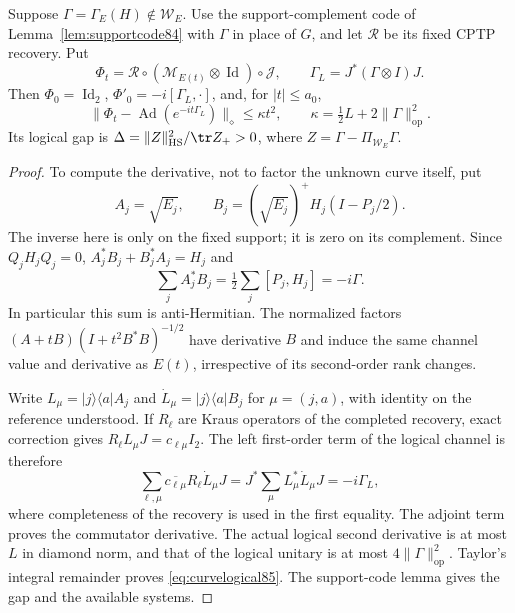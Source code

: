 \begin{lemma}
\label{lem:curvelogical85}
Suppose $\Gamma=\Gamma_E(H)\notin\mathcal W_E$.
Use the support-complement code of Lemma~\ref{lem:supportcode84}
with $\Gamma$ in place of $G$, and let $\mathcal R$ be its fixed
CPTP recovery.  Put
\[
 \Phi_t=\mathcal R\circ(\mathcal M_{E(t)}\otimes\operatorname{Id})
             \circ\mathcal J,\qquad
 \Gamma_L=J^*(\Gamma\otimes I)J.
\]
Then $\Phi_0=\operatorname{Id}_2$, $\Phi'_0=-i[\Gamma_L,\cdot]$,
and, for $|t|\le a_0$,
\begin{equation}\label{eq:curvelogical85}
 \|\Phi_t-\operatorname{Ad}(e^{-it\Gamma_L})\|_\diamond
 \le\kappa t^2,\qquad
 \kappa=\tfrac12L+2\|\Gamma\|_{\mathrm{op}}^2.
\end{equation}
Its logical gap is
$\Delta=\|Z\|_{\mathrm{HS}}^2/\tr Z_+>0$,
where $Z=\Gamma-\Pi_{\mathcal W_E}\Gamma$.
\end{lemma}
\begin{proof}
To compute the derivative, not to factor the unknown curve itself,
put
\[
 A_j=\sqrt{E_j},\qquad
 B_j=(\sqrt{E_j})^+H_j(I-P_j/2).
\]
The inverse here is only on the fixed support; it is zero on its
complement.  Since $Q_jH_jQ_j=0$,
$A_j^*B_j+B_j^*A_j=H_j$ and
\[
 \sum_j A_j^*B_j=\tfrac12\sum_j[P_j,H_j]=-i\Gamma.
\]
In particular this sum is anti-Hermitian.  The normalized factors
$(A+tB)(I+t^2B^*B)^{-1/2}$ have derivative $B$ and induce the
same channel value and derivative as $E(t)$, irrespective of its
second-order rank changes.

Write $L_\mu=|j\rangle\langle a|A_j$ and
$\dot L_\mu=|j\rangle\langle a|B_j$ for $\mu=(j,a)$,
with identity on the reference understood.  If $R_\ell$ are Kraus
operators of the completed recovery, exact correction gives
$R_\ell L_\mu J=c_{\ell\mu}I_2$.
The left first-order term of the logical channel is therefore
\[
 \sum_{\ell,\mu}\overline{c_{\ell\mu}}
                  R_\ell\dot L_\mu J
 =J^*\sum_\mu L_\mu^*\dot L_\mu J
 =-i\Gamma_L,
\]
where completeness of the recovery is used in the first equality.
The adjoint term proves the commutator derivative.  The actual
logical second derivative is at most $L$ in diamond norm, and that
of the logical unitary is at most $4\|\Gamma\|_{\mathrm{op}}^2$.
Taylor's integral remainder proves \eqref{eq:curvelogical85}.
The support-code lemma gives the gap and the available systems.
\end{proof}

